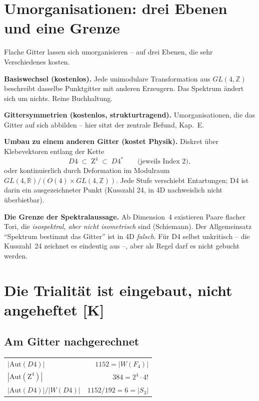 \documentclass[11pt]{report}
\begin{document}
\chapter{Umorganisationen: drei Ebenen und eine Grenze}

Flache Gitter lassen sich umorganisieren -- auf drei Ebenen, die
sehr Verschiedenes kosten.

\textbf{Basiswechsel (kostenlos).} Jede unimodulare Transformation
aus $GL(4,\mathbb{Z})$ beschreibt dasselbe Punktgitter mit anderen
Erzeugern. Das Spektrum ändert sich um nichts. Reine Buchhaltung.

\textbf{Gittersymmetrien (kostenlos, strukturtragend).}
Umorganisationen, die das Gitter auf sich abbilden -- hier sitzt der
zentrale Befund, Kap.~E.

\textbf{Umbau zu einem anderen Gitter (kostet Physik).} Diskret über
Klebevektoren entlang der Kette
\begin{equation}
  D4 \;\subset\; \text{Z}^4 \;\subset\; D4^{*}
  \qquad\text{(jeweils Index 2)},
\end{equation}
oder kontinuierlich durch Deformation im Modulraum
$GL(4,\mathbb{R})/(O(4)\times GL(4,\mathbb{Z}))$. Jede Stufe
verschiebt Entartungen; D4 ist darin ein ausgezeichneter Punkt
(Kusszahl 24, in 4D nachweislich nicht überbietbar).

\textbf{Die Grenze der Spektralaussage.} Ab Dimension~4 existieren
Paare flacher Tori, die \emph{isospektral, aber nicht isometrisch}
sind (Schiemann). Der Allgemeinsatz \enquote{Spektrum bestimmt das
Gitter} ist in 4D \emph{falsch}. Für D4 selbst unkritisch -- die
Kusszahl~24 zeichnet es eindeutig aus --, aber als Regel darf es
nicht gebucht werden.

\chapter{Die Trialität ist eingebaut, nicht angeheftet [K]}

\section{Am Gitter nachgerechnet}

\begin{center}
\begin{tabular}{lr}
\toprule
$|\text{Aut}(D4)|$ & $1152 = |W(F_4)|$ \\
$|\text{Aut}(\text{Z}^4)|$ & $384 = 2^4\cdot4!$ \\
$|\text{Aut}(D4)|/|W(D4)|$ & $1152/192 = 6 = |S_3|$ \\
\bottomrule
\end{tabular}
\end{center}
\end{document}
